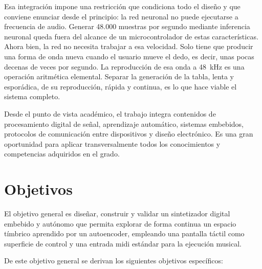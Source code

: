 Esa integración impone una restricción que condiciona todo el diseño y que
conviene enunciar desde el principio: la red neuronal no puede ejecutarse a
frecuencia de audio. Generar 48.000 muestras por segundo mediante inferencia
neuronal queda fuera del alcance de un microcontrolador de estas
características. Ahora bien, la red no necesita trabajar a esa velocidad. Solo
tiene que producir una forma de onda nueva cuando el usuario mueve el dedo, es
decir, unas pocas decenas de veces por segundo. La reproducción de esa onda a
48~kHz es una operación aritmética elemental. Separar la generación de la tabla,
lenta y esporádica, de su reproducción, rápida y continua, es lo que hace viable
el sistema completo.

Desde el punto de vista académico, el trabajo integra contenidos de
procesamiento digital de señal, aprendizaje automático, sistemas embebidos,
protocolos de comunicación entre dispositivos y diseño electrónico. Es una gran
oportunidad para aplicar transversalmente todos los conocimientos y competencias
adquiridos en el grado.

\section{Objetivos}
\hypertarget{RE1.3}{}\label{RE1.3}

El objetivo general es diseñar, construir y validar un sintetizador digital
embebido y autónomo que permita explorar de forma continua un espacio tímbrico
aprendido por un autoencoder, empleando una pantalla táctil como superficie de
control y una entrada \gls{midi} estándar para la ejecución musical.

De este objetivo general se derivan los siguientes objetivos específicos:

